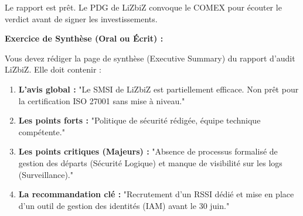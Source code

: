 Le rapport est prêt. Le PDG de LiZbiZ convoque le COMEX pour écouter le verdict avant de signer les investissements.

\begin{boxlizbiz}
\textbf{Exercice de Synthèse (Oral ou Écrit) :}

Vous devez rédiger la page de synthèse (Executive Summary) du rapport d'audit LiZbiZ. Elle doit contenir :

\begin{enumerate}
    \item \textbf{L'avis global :} "Le SMSI de LiZbiZ est partiellement efficace. Non prêt pour la certification ISO 27001 sans mise à niveau."
    \item \textbf{Les points forts :} "Politique de sécurité rédigée, équipe technique compétente."
    \item \textbf{Les points critiques (Majeurs) :} "Absence de processus formalisé de gestion des départs (Sécurité Logique) et manque de visibilité sur les logs (Surveillance)."
    \item \textbf{La recommandation clé :} "Recrutement d'un RSSI dédié et mise en place d'un outil de gestion des identités (IAM) avant le 30 juin."
\end{enumerate}
\end{boxlizbiz}

